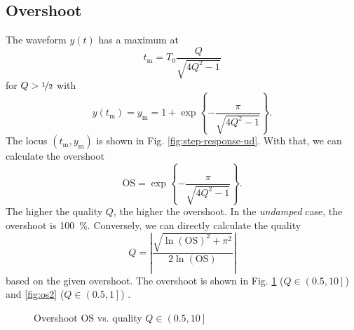 \documentclass{article}[11pt]
\begin{document}
\subsection{Overshoot}

The waveform $y(t)$ has a maximum at 
\begin{equation}
t_{\mathrm{m}} = T_0 \frac{Q}{\sqrt{4Q^2-1}}
\end{equation}
for $Q > \nicefrac{1}{2}$ with
\begin{equation}
y(t_{\mathrm{m}}) =y_{\mathrm{m}} = 1 + \exp\left\{-\frac{\pi}{\sqrt{4Q^2-1}}\right\}.
\end{equation}
The locus $(t_{\mathrm{m}},y_{\mathrm{m}})$ is shown in Fig. \ref{fig:step-response-ud}.
With that, we can calculate the overshoot
\begin{equation}
\mathrm{OS} =  \exp\left\{-\frac{\pi}{\sqrt{4Q^2-1}}\right\}.
\end{equation}
The higher the quality $Q$, the higher the overshoot.
In the \textit{undamped} case, the overshoot is \SI{100}{\percent}.
Conversely, we can directly calculate the quality 
\begin{equation}
Q = \left|\frac{\sqrt{\ln\left(\mathrm{OS}\right)^2+\pi^2}}{2\ln\left(\mathrm{OS}\right)}\right|
\end{equation}
based on the given overshoot.
The overshoot is shown in Fig. \ref{fig:os1} ($Q\in\left(0.5,10\right]$) 
and \ref{fig:os2} ($Q\in\left(0.5,1\right]$) .
\begin{figure}[H]
  \centering
  \caption{Overshoot $\mathrm{OS}$ vs. quality $Q\in\left(0.5,10\right]$}
  \label{fig:os1}
\end{figure}
\end{document}
